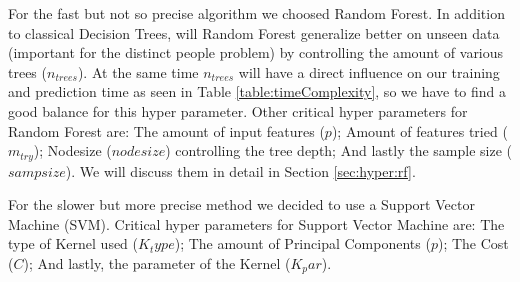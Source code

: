 \documentclass[conference]{IEEEtran}
\begin{document}
\textcolor{til}{
    For the fast but not so precise algorithm we choosed Random Forest. In addition to classical Decision Trees, will Random Forest generalize better on unseen data (important for the distinct people problem) by controlling the amount of various trees ($n_{trees}$). At the same time $n_{trees}$ will have a direct influence on our training and prediction time as seen in Table \ref{table:timeComplexity}, so we have to find a good balance for this hyper parameter. Other critical hyper parameters for Random Forest are: The amount of input features ($p$); Amount of features tried ($m_{try}$); Nodesize (${nodesize}$) controlling the tree depth; And lastly the sample size (${sampsize}$). We will discuss them in detail in Section \ref{sec:hyper:rf}.}

\textcolor{maxim}{
    For the slower but more precise method we decided to use a Support Vector Machine (SVM). 
}
\textcolor{maxim}{
    Critical hyper parameters for Support Vector Machine are: The type of Kernel used ($K_type$); The amount of Principal Components ($p$); The Cost ($C$); And lastly, the parameter of the Kernel ($K_par$).
}


\end{document}
